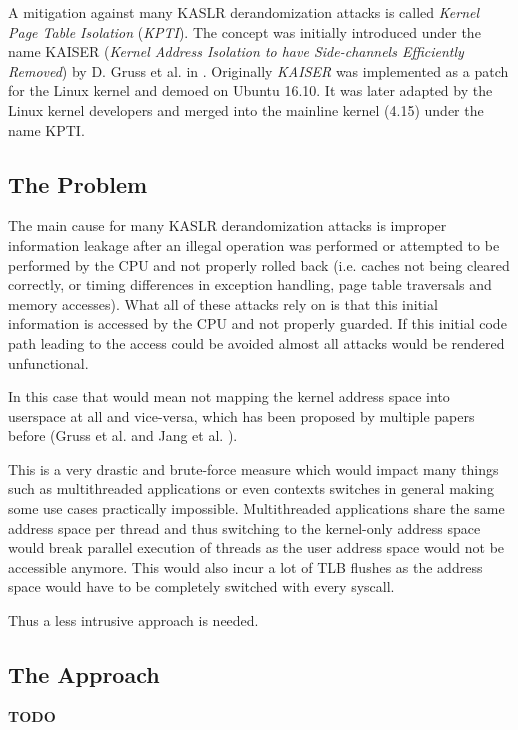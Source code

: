 A mitigation against many KASLR derandomization attacks is called \textit{Kernel Page Table Isolation} (\textit{KPTI}).
The concept was initially introduced under the name KAISER (\textit{Kernel Address Isolation to have Side-channels Efficiently Removed}) by D. Gruss et al. in \cite{kaiser}.
Originally \textit{KAISER} was implemented as a patch for the Linux kernel and demoed on Ubuntu 16.10.
It was later adapted by the Linux kernel developers and merged into the mainline kernel (4.15) under the name KPTI.

\subsection{The Problem}

The main cause for many KASLR derandomization attacks is improper information leakage after an illegal operation was performed or attempted to be performed by the CPU and not properly rolled back (i.e. caches not being cleared correctly, or timing differences in exception handling, page table traversals and memory accesses).
What all of these attacks rely on is that this initial information is accessed by the CPU and not properly guarded.
If this initial code path leading to the access could be avoided almost all attacks would be rendered unfunctional.

In this case that would mean not mapping the kernel address space into userspace at all and vice-versa, which has been proposed by multiple papers before (Gruss et al. \cite{prefetch-side-channel-smap} and Jang et al. \cite{drk}).

This is a very drastic and brute-force measure which would impact many things such as multithreaded applications or even contexts switches in general making some use cases practically impossible.
Multithreaded applications share the same address space per thread and thus switching to the kernel-only address space would break parallel execution of threads as the user address space would not be accessible anymore.
This would also incur a lot of TLB flushes as the address space would have to be completely switched with every syscall.

Thus a less intrusive approach is needed.

\subsection{The Approach}

\textbf{TODO}

